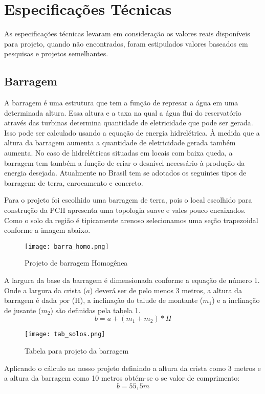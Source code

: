 \chapter{Especificações Técnicas}
As especificações técnicas levaram em consideração os valores reais disponíveis para projeto, quando não encontrados, foram estipulados valores baseados em pesquisas e projetos semelhantes.
\section{Barragem}
A barragem é uma estrutura que tem a função de represar a água em uma determinada altura. Essa altura e a taxa na qual a água flui do reservatório através das turbinas determina quantidade de eletricidade que pode ser gerada. Isso pode ser calculado usando a equação de energia hidrelétrica. À medida que a altura da barragem aumenta a quantidade de eletricidade gerada também aumenta. No caso de hidrelétricas situadas em locais com baixa queda, a barragem tem também a função de criar o desnível necessário à produção da energia desejada. Atualmente no Brasil tem se adotados os seguintes tipos de barragem: de terra, enrocamento e concreto.

Para o projeto foi escolhido uma barragem de terra, pois o local escolhido para construção da PCH apresenta uma topologia suave e vales pouco encaixados. Como o solo da região é tipicamente arenoso selecionamos uma seção trapezoidal conforme a imagem abaixo.
\begin{figure}[h]
	\centering
	\texttt{[image: barra\_homo.png]}
	\caption{Projeto de barragem Homogênea}
	\label{fig:barra_homo}
\end{figure}

A largura da base da barragem é dimensionada conforme a equação de número 1. Onde a largura da crista ($a$) deverá ser de pelo menos 3 metros, a altura da barragem é dada por (H), a inclinação do talude de montante ($m_1$) e a inclinação de jusante ($m_2$) são definidas pela tabela 1.
\begin{equation}
	b = a + (m_1 + m_2)*H
\end{equation}

\begin{figure}[h]
	\centering
	\texttt{[image: tab\_solos.png]}
	\caption{Tabela para projeto da barragem}
	\label{fig:tab_solos}
\end{figure}
Aplicando o cálculo no nosso projeto definindo a altura da crista como 3 metros e a altura da barragem como 10 metros obtém-se o se valor de comprimento:
\begin{equation}
b = 55,5 m
\end{equation}

